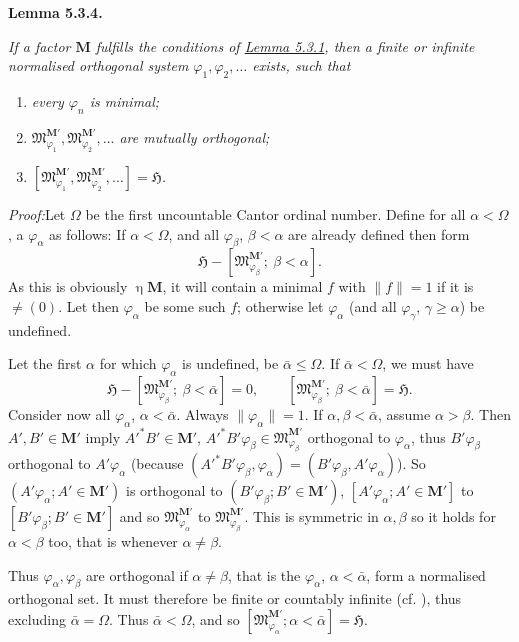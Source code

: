 \documentclass[12pt,b5paper,twoside]{article}
\newcommand{\Hspace}{\mathfrak H}
\newcommand{\M}{\mathbf M}
\newcommand{\Lemma}[1]{%
  \par\smallskip\noindent\phantomsection\label{lem:#1}\textbf{Lemma #1.}\enspace
}
\newcommand{\Proof}{\par\noindent\textit{Proof:}\enspace}
\newcommand{\lemref}[1]{\hyperref[lem:#1]{Lemma #1}}
\begin{document}
\Lemma{5.3.4}
\emph{If a factor $\M$ fulfills the conditions of \lemref{5.3.1}, then a
finite or infinite normalised orthogonal system $\varphi_1,\varphi_2,\ldots$
exists, such that}
\begin{enumerate}[label=(\roman*)]
\item \emph{every $\varphi_n$ is minimal;}
\item \emph{$\mathfrak M_{\varphi_1}^{\M'},
  \mathfrak M_{\varphi_2}^{\M'},\ldots$ are mutually orthogonal;}
\item \emph{$[\mathfrak M_{\varphi_1}^{\M'},
  \mathfrak M_{\varphi_2}^{\M'},\ldots]=\Hspace$.}
\end{enumerate}

\Proof Let $\Omega$ be the first uncountable Cantor ordinal number. Define for
all $\alpha<\Omega$, a $\varphi_\alpha$ as follows: If $\alpha<\Omega$, and
all $\varphi_\beta$, $\beta<\alpha$ are already defined then form
\[
 \Hspace-[\mathfrak M_{\varphi_\beta}^{\M'};\ \beta<\alpha].
\]
As this is obviously $\mathrel\eta\M$, it will contain a minimal $f$ with
$\lVert f\rVert=1$ if it is $\neq(0)$. Let then $\varphi_\alpha$ be some such
$f$; otherwise let $\varphi_\alpha$ (and all $\varphi_\gamma$,
$\gamma\geq\alpha$) be undefined.

Let the first $\alpha$ for which $\varphi_\alpha$ is undefined, be
$\bar\alpha\leq\Omega$. If $\bar\alpha<\Omega$, we must have
\[
 \Hspace-[\mathfrak M_{\varphi_\beta}^{\M'};\ \beta<\bar\alpha]=0,
 \qquad
 [\mathfrak M_{\varphi_\beta}^{\M'};\ \beta<\bar\alpha]=\Hspace.
\]
Consider now all $\varphi_\alpha$, $\alpha<\bar\alpha$. Always
$\lVert\varphi_\alpha\rVert=1$. If $\alpha,\beta<\bar\alpha$, assume
$\alpha>\beta$. Then $A',B'\in\M'$ imply $A'^*B'\in\M'$,
$A'^*B'\varphi_\beta\in\mathfrak M_{\varphi_\beta}^{\M'}$ orthogonal to
$\varphi_\alpha$, thus $B'\varphi_\beta$ orthogonal to
$A'\varphi_\alpha$ (because
$(A'^*B'\varphi_\beta,\varphi_\alpha)
=(B'\varphi_\beta,A'\varphi_\alpha)$). So
$(A'\varphi_\alpha;A'\in\M')$ is orthogonal to
$(B'\varphi_\beta;B'\in\M')$,
$[A'\varphi_\alpha;A'\in\M']$ to
$[B'\varphi_\beta;B'\in\M']$ and so
$\mathfrak M_{\varphi_\alpha}^{\M'}$ to
$\mathfrak M_{\varphi_\beta}^{\M'}$. This is symmetric in $\alpha,\beta$ so
it holds for $\alpha<\beta$ too, that is whenever $\alpha\neq\beta$.

Thus $\varphi_\alpha,\varphi_\beta$ are orthogonal if
$\alpha\neq\beta$, that is the $\varphi_\alpha$, $\alpha<\bar\alpha$, form a
normalised orthogonal set. It must therefore be finite or countably infinite
(cf. \cite[p.~66]{ref16}), thus excluding $\bar\alpha=\Omega$. Thus
$\bar\alpha<\Omega$, and so
$[\mathfrak M_{\varphi_\alpha}^{\M'};\alpha<\bar\alpha]=\Hspace$.
\end{document}
